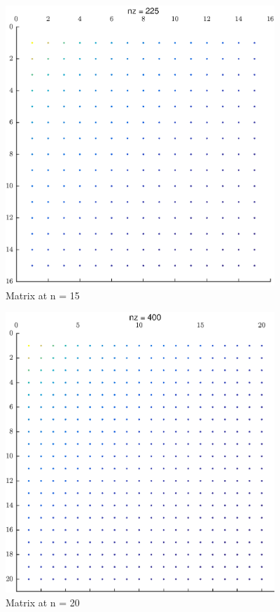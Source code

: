 \documentclass[11pt]{article}
\begin{document}
\begin{figure}[!hbt]
\begin{center}
	\includegraphics[width=4in]{math609_pa1_comp_example_3_n_15.eps}
	\caption{Matrix  at n = 15}
\end{center}
\end{figure}

\begin{figure}[!hbt]
\begin{center}
	\includegraphics[width=4in]{math609_pa1_comp_example_3_n_20.eps}
	\caption{Matrix  at n = 20}
\end{center}
\end{figure}
\end{document}
